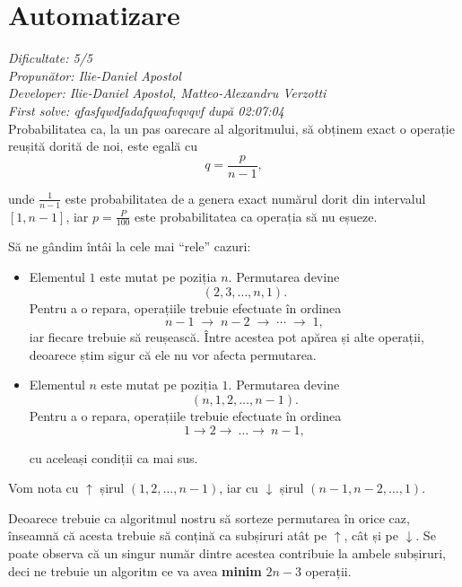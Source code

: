 \newcommand{\pluseq}{\mathrel{+\mkern-5mu=}}

\section{Automatizare}
\textit{Dificultate: 5/5} \\
\textit{Propunător: Ilie-Daniel Apostol} \\
\textit{Developer: Ilie-Daniel Apostol, Matteo-Alexandru Verzotti} \\
\textit{First solve: qfasfqwdfadafqwafvqvqvf după 02:07:04}  \\

Probabilitatea ca, la un pas oarecare al algoritmului, să obținem exact o operație reușită dorită de noi, este egală cu
\[
    q = \frac{p}{n - 1}
,\]

unde $\frac{1}{n - 1}$ este probabilitatea de a genera exact numărul dorit din intervalul $[1, n - 1]$, iar $p = \frac{P}{100}$ este probabilitatea ca operația să nu eșueze.

\medskip

Să ne gândim întâi la cele mai ``rele'' cazuri:
\begin{itemize}
    \item Elementul $1$ este mutat pe poziția $n$.
    Permutarea devine
    \[
        (2, 3, \ldots, n, 1).
    \]
    Pentru a o repara, operațiile trebuie efectuate
    în ordinea
    \[
        n-1 \;\longrightarrow\; n-2
        \;\longrightarrow\; \cdots
        \;\longrightarrow\; 1,
    \]
    iar fiecare trebuie să reușească. Între acestea pot
    apărea și alte operații, deoarece știm sigur că
    ele nu vor afecta permutarea.
\item Elementul $n$ este mutat pe poziția $1$.
    Permutarea devine
    \[
	(n, 1, 2, \dots, n - 1).
    \]
    Pentru a o repara, operațiile trebuie efectuate în ordinea
    \[
        1 \longrightarrow 2 \longrightarrow\ \dots \longrightarrow\ n - 1,
    \]
    
    cu aceleași condiții ca mai sus.
\end{itemize}

Vom nota cu $\uparrow$ șirul $(1, 2, \dots, n - 1)$, iar cu $\downarrow$ șirul $(n - 1, n - 2, \dots, 1)$.

Deoarece trebuie ca algoritmul nostru să sorteze permutarea în orice caz, înseamnă că acesta trebuie să conțină ca subșiruri atât pe $\uparrow$, cât și pe $\downarrow$. Se poate observa că un singur număr dintre acestea contribuie la ambele subșiruri, deci ne trebuie un algoritm ce va avea \textbf{minim} $2n - 3$ operații.

